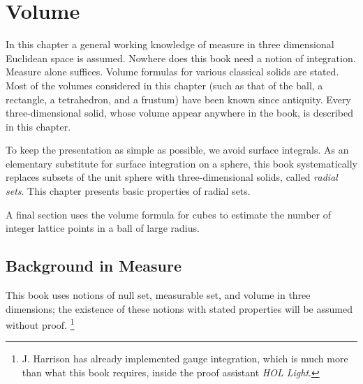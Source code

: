 


\chapter{Volume}\label{chapter:volume}

\begin{summary}
  In this chapter a general working knowledge of measure in three
  dimensional Euclidean space is assumed.  Nowhere does this book need
  a notion of integration.  Measure alone suffices.  Volume formulas
  for various classical solids are stated.  Most of the volumes
  considered in this chapter (such as that of the ball, a rectangle, a
  tetrahedron, and a frustum) have been known since antiquity.  Every
  three-dimensional solid, whose volume appear anywhere in the book,
  is described in this chapter.

  To keep the presentation as simple as possible,  we avoid surface integrals.
  As an elementary substitute for surface
  integration on a sphere, this book systematically replaces
  subsets of the unit sphere with three-dimensional solids, called {\it radial
    sets}.  This chapter presents basic properties of radial sets.

  A final section uses the volume formula for cubes to estimate the number
  of integer lattice points in a ball of large radius.
\end{summary}

\section{Background in Measure}
%


This book uses notions of null set, measurable set, and volume in
three dimensions; the existence of these notions with
stated properties will be assumed without proof. \footnote{J. Harrison has already implemented gauge integration, which is much
more than what this book requires, inside the proof assistant {\it HOL
Light}.}




